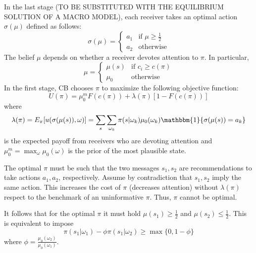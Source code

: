 \documentclass{article}
\begin{document}
In the last stage (TO BE SUBSTITUTED WITH THE EQUILIBRIUM SOLUTION OF A MACRO MODEL), each receiver takes an optimal action $\sigma(\mu)$ defined as follows:
$$\sigma(\mu)=\left\{\begin{array}{cc}
  a_1   &  \mbox{if } \mu\geq \frac{1}{2}\\
  a_2   &  \mbox{otherwise}
\end{array}\right.$$
The belief $\mu$ depends on whether a receiver devotes attention to $\pi$. In particular,
$$\mu=\left\{\begin{array}{cc}
  \mu(s)   &  \mbox{if } c_i\geq c(\pi)\\
  \mu_0   &  \mbox{otherwise}
\end{array}\right.$$
In the first stage, CB chooses $\pi$ to maximize the following objective function:
$$U(\pi)=\mu_0^mF(c(\pi))+\lambda(\pi)[1-F(c(\pi))]$$
where
$$\lambda(\pi)=E_\pi[u(\sigma(\mu(s)),\omega)]=\sum_s\sum_{\omega_k}\pi(s|\omega_k)\mu_0(\omega_k)\mathbbm{1}\{\sigma(\mu(s))=a_{k}\}$$
is the expected payoff from receivers who are devoting attention and $\mu_0^m=\max_{\omega}\mu_0(\omega)$ is the prior of the most plausible state.

The optimal $\pi$ must be such that the two messages $s_1,s_2$ are recommendations to take actions $a_1,a_2$, respectively. Assume by contradiction that $s_1,s_2$ imply the same action. This increases the cost of $\pi$ (decreases attention) without $\lambda(\pi)$ respect to the benchmark of an uninformative $\pi$. Thus, $\pi$ cannot be optimal. 

It follows that for the optimal $\pi$ it must hold $\mu(s_1)\geq \frac{1}{2}$ and $\mu(s_2)\leq\frac{1}{2}$. This is equivalent to impose
$$\pi(s_1|\omega_1)-\phi\pi(s_1|\omega_2)\geq \max\{0,1-\phi\}$$
where $\phi=\frac{\mu_0(\omega_2)}{\mu_0(\omega_1)}$.
\end{document}

